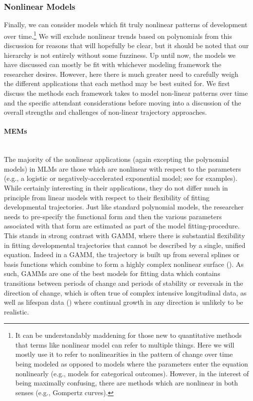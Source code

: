 \documentclass[11pt]{article}
\newcommand{\subsubsubsection}[1]{\paragraph{#1}\mbox{}\\}  %
\begin{document}
\subsubsection{Nonlinear Models}
Finally, we can consider models which fit truly nonlinear patterns of development over time.\footnote{It can be understandably maddening for those new to quantitative methods that terms like nonlinear model can refer to multiple things. Here we will mostly use it to refer to nonlinearities in the pattern of change over time being modeled as opposed to models where the parameters enter the equation nonlinearly (e.g., models for categorical outcomes). However, in the interest of being maximally confusing, there are methods which are nonlinear in both senses (e.g., Gompertz curves).} We will exclude nonlinear trends based on polynomials from this discussion for reasons that will hopefully be clear, but it should be noted that our hierarchy is not entirely without some fuzziness. Up until now, the models we have discussed can mostly be fit with whichever modeling framework the researcher desires. However, here there is much greater need to carefully weigh the different applications that each method may be best suited for. We first discuss the methods each framework takes to model non-linear patterns over time and the specific attendant considerations before moving into a discussion of the overall strengths and challenges of non-linear trajectory approaches.

\subsubsubsection{MEMs}
The majority of the nonlinear applications (again excepting the polynomial models) in MLMs are those which are nonlinear with respect to the parameters (e.g., a logistic or negatively-accelerated exponential model; see \cite{cudeck_analysis_2007,grimm_nonlinear_2009,harring_fitting_2014} for examples). While certainly interesting in their applications, they do not differ much in principle from linear models with respect to their flexibility of fitting developmental trajectories. Just like standard polynomial models, the researcher needs to pre-specify the functional form and then the various parameters associated with that form are estimated as part of the model fitting-procedure. This stands in strong contrast with GAMM, where there is substantial flexibility in fitting developmental trajectories that cannot be described by a single, unified equation. Indeed in a GAMM, the trajectory is built up from several splines or basis functions which combine to form a highly complex nonlinear surface (\cite{lin_inference_1999,sorensen_recipe_2021,wood_fast_2011}). As such, GAMMs are one of the best models for fitting data which contains transitions between periods of change and periods of stability or reversals in the direction of change, which is often true of complex intensive longitudinal data, as well as lifespan data (\cite{sorensen_recipe_2021,tamnes_development_2017}) where continual growth in any direction is unlikely to be realistic.
\end{document}
